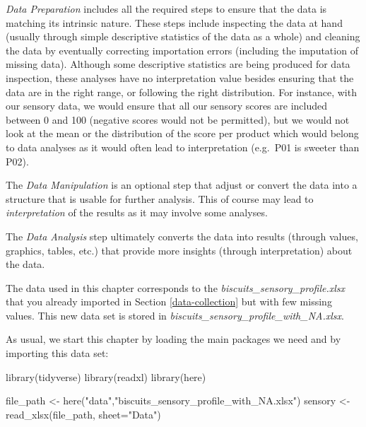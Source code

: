 \documentclass[
]{krantz}
\makeatletter
\newenvironment{Shaded}{\begin{snugshade}}{\end{snugshade}}
\newcommand{\AttributeTok}[1]{\textcolor[rgb]{0.61,0.61,0.61}{#1}}
\newcommand{\FunctionTok}[1]{\textcolor[rgb]{0,0,0}{#1}}
\newcommand{\NormalTok}[1]{#1}
\newcommand{\OtherTok}[1]{\textcolor[rgb]{0.37,0.37,0.37}{#1}}
\newcommand{\StringTok}[1]{\textcolor[rgb]{0.5,0.5,0.5}{#1}}
\newenvironment{kframe}{%
\medskip{}
\setlength{\fboxsep}{.8em}
 \def\at@end@of@kframe{}%
 \ifinner\ifhmode%
  \def\at@end@of@kframe{\end{minipage}}%
  \begin{minipage}{\columnwidth}%
 \fi\fi%
 \def\FrameCommand##1{\hskip\@totalleftmargin \hskip-\fboxsep
 \colorbox{shadecolor}{##1}\hskip-\fboxsep
     \hskip-\linewidth \hskip-\@totalleftmargin \hskip\columnwidth}%
 \MakeFramed {\advance\hsize-\width
   \@totalleftmargin\z@ \linewidth\hsize
   \@setminipage}}%
 {\par\unskip\endMakeFramed%
 \at@end@of@kframe}
\renewenvironment{Shaded}{\begin{kframe}}{\end{kframe}}
\makeatother
\begin{document}
\emph{Data Preparation} includes all the required steps to ensure that the data is matching its intrinsic nature. These steps include inspecting the data at hand (usually through simple descriptive statistics of the data as a whole) and cleaning the data by eventually correcting importation errors (including the imputation of missing data). Although some descriptive statistics are being produced for data inspection, these analyses have no interpretation value besides ensuring that the data are in the right range, or following the right distribution. For instance, with our sensory data, we would ensure that all our sensory scores are included between 0 and 100 (negative scores would not be permitted), but we would not look at the mean or the distribution of the score per product which would belong to data analyses as it would often lead to interpretation (e.g.~P01 is sweeter than P02).

The \emph{Data Manipulation} is an optional step that adjust or convert the data into a structure that is usable for further analysis. This of course may lead to \emph{interpretation} of the results as it may involve some analyses.

The \emph{Data Analysis} step ultimately converts the data into results (through values, graphics, tables, etc.) that provide more insights (through interpretation) about the data.

The data used in this chapter corresponds to the \emph{biscuits\_sensory\_profile.xlsx} that you already imported in Section \ref{data-collection} but with few missing values. This new data set is stored in \emph{biscuits\_sensory\_profile\_with\_NA.xlsx}.

As usual, we start this chapter by loading the main packages we need and by importing this data set:

\begin{Shaded}
\begin{Highlighting}[]
\FunctionTok{library}\NormalTok{(tidyverse)}
\FunctionTok{library}\NormalTok{(readxl)}
\FunctionTok{library}\NormalTok{(here)}

\NormalTok{file\_path }\OtherTok{\textless{}{-}} \FunctionTok{here}\NormalTok{(}\StringTok{"data"}\NormalTok{,}\StringTok{"biscuits\_sensory\_profile\_with\_NA.xlsx"}\NormalTok{)}
\NormalTok{sensory }\OtherTok{\textless{}{-}} \FunctionTok{read\_xlsx}\NormalTok{(file\_path, }\AttributeTok{sheet=}\StringTok{"Data"}\NormalTok{)}
\end{Highlighting}
\end{Shaded}
\end{document}
